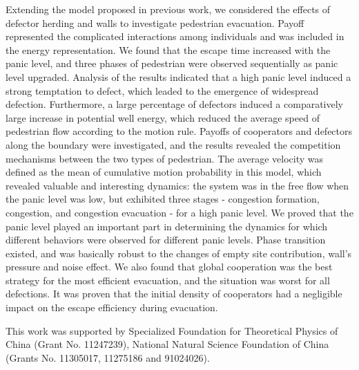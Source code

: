 \documentclass[%
 reprint,
 amsmath,amssymb,
 aps,
]{revtex4-1}
\begin{document}
Extending the model proposed in previous work, we considered the effects of defector herding and walls to investigate pedestrian evacuation. Payoff represented the complicated interactions among individuals and was included in the energy representation. We found that the escape time increased with the panic level, and three phases of pedestrian were observed sequentially as panic level upgraded. Analysis of the results indicated that a high panic level induced a strong temptation to defect, which leaded to the emergence of widespread defection. Furthermore, a large percentage of defectors induced a comparatively large increase in potential well energy, which reduced the average speed of pedestrian flow according to the motion rule. Payoffs of cooperators and defectors along the boundary were investigated, and the results revealed the competition mechanisms between the two types of pedestrian. The average velocity was defined as the mean of cumulative motion probability in this model, which revealed valuable and interesting dynamics: the system was in the free flow when the panic level was low, but exhibited three stages - congestion formation, congestion, and congestion evacuation - for a high panic level. We proved that the panic level played an important part in determining the dynamics for which different behaviors were observed for different panic levels. Phase transition existed, and was basically robust to the changes of empty site contribution, wall's pressure and noise effect. We also found that global cooperation was the best strategy for the most efficient evacuation, and the situation was worst for all defections. It was proven that the initial density of cooperators had a negligible impact on the escape efficiency during evacuation.


\begin{acknowledgments}
This work was supported by Specialized Foundation for Theoretical Physics of China (Grant No. 11247239), National Natural Science Foundation of China (Grants No. 11305017, 11275186 and 91024026).
\end{acknowledgments}





\nocite{*}
\end{document}
